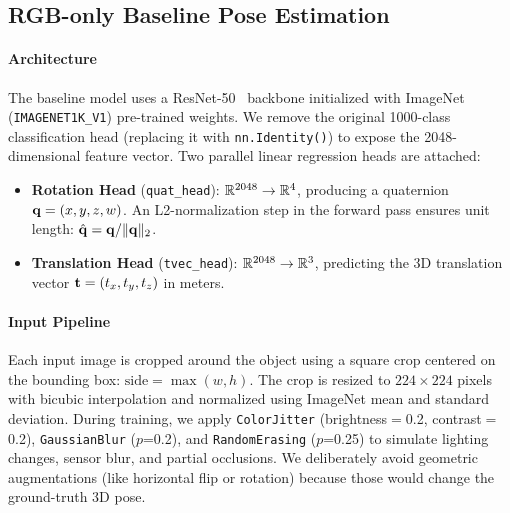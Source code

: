 \subsection{RGB-only Baseline Pose Estimation}
\label{sec:method_baseline}

\paragraph{Architecture}
The baseline model uses a ResNet-50~\cite{he2016deep} backbone initialized with ImageNet~\cite{deng2009imagenet} (\texttt{IMAGENET1K\_V1}) pre-trained weights. We remove the original 1000-class classification head (replacing it with \texttt{nn.Identity()}) to expose the 2048-dimensional feature vector. Two parallel linear regression heads are attached:

\begin{itemize}
    \item \textbf{Rotation Head} (\texttt{quat\_head}): $\mathbb{R}^{2048} \rightarrow \mathbb{R}^{4}$, producing a quaternion $\mathbf{q} = (x, y, z, w)$. An L2-normalization step in the forward pass ensures unit length: $\hat{\mathbf{q}} = \mathbf{q} / \|\mathbf{q}\|_2$.
    \item \textbf{Translation Head} (\texttt{tvec\_head}): $\mathbb{R}^{2048} \rightarrow \mathbb{R}^{3}$, predicting the 3D translation vector $\mathbf{t} = (t_x, t_y, t_z)$ in meters.
\end{itemize}

\paragraph{Input Pipeline}
Each input image is cropped around the object using a square crop centered on the bounding box: $\text{side} = \max(w, h)$. The crop is resized to $224 \times 224$ pixels with bicubic interpolation and normalized using ImageNet mean and standard deviation. During training, we apply \texttt{ColorJitter} (brightness$=$0.2, contrast$=$0.2), \texttt{GaussianBlur} ($p$=0.2), and \texttt{RandomErasing} ($p$=0.25) to simulate lighting changes, sensor blur, and partial occlusions. We deliberately avoid geometric augmentations (like horizontal flip or rotation) because those would change the ground-truth 3D pose.

